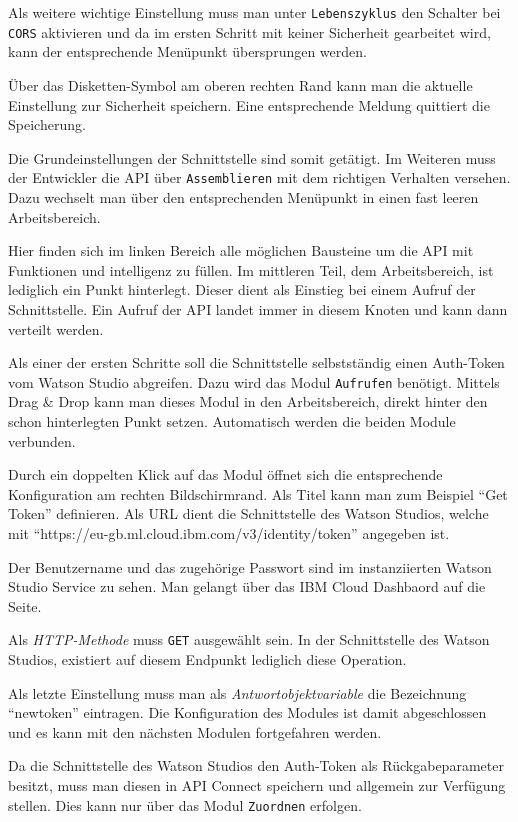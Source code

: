Als weitere wichtige Einstellung muss man unter \texttt{Lebenszyklus} den Schalter bei \texttt{CORS} aktivieren und da
im ersten Schritt mit keiner Sicherheit gearbeitet wird, kann der entsprechende Menüpunkt übersprungen werden.

Über das Disketten-Symbol am oberen rechten Rand kann man die aktuelle Einstellung zur Sicherheit speichern. Eine
entsprechende Meldung quittiert die Speicherung.

Die Grundeinstellungen der Schnittstelle sind somit getätigt. Im Weiteren muss der Entwickler die API über
\texttt{Assemblieren} mit dem richtigen Verhalten versehen. Dazu wechselt man über den entsprechenden Menüpunkt in einen
fast leeren Arbeitsbereich.

Hier finden sich im linken Bereich alle möglichen Bausteine um die API mit Funktionen und intelligenz zu füllen. Im
mittleren Teil, dem Arbeitsbereich, ist lediglich ein Punkt hinterlegt. Dieser dient als Einstieg bei einem Aufruf der
Schnittstelle. Ein Aufruf der API landet immer in diesem Knoten und kann dann verteilt werden.

Als einer der ersten Schritte soll die Schnittstelle selbstständig einen Auth-Token vom Watson Studio abgreifen. Dazu
wird das Modul \texttt{Aufrufen} benötigt. Mittels Drag \& Drop kann man dieses Modul in den Arbeitsbereich, direkt
hinter den schon hinterlegten Punkt setzen. Automatisch werden die beiden Module verbunden.

Durch ein doppelten Klick auf das Modul öffnet sich die entsprechende Konfiguration am rechten Bildschirmrand. Als Titel
kann man zum Beispiel \enquote{Get Token} definieren. Als URL dient die Schnittstelle des Watson Studios, welche mit
\enquote{https://eu-gb.ml.cloud.ibm.com/v3/identity/token} angegeben ist.

Der Benutzername und das zugehörige Passwort sind im instanziierten Watson Studio Service zu sehen. Man gelangt über das
IBM Cloud Dashbaord auf die Seite.

Als \textit{HTTP-Methode} muss \texttt{GET} ausgewählt sein. In der Schnittstelle des Watson Studios, existiert auf
diesem Endpunkt lediglich diese Operation.

Als letzte Einstellung muss man als \textit{Antwortobjektvariable} die Bezeichnung \enquote{newtoken} eintragen. Die
Konfiguration des Modules ist damit abgeschlossen und es kann mit den nächsten Modulen fortgefahren werden.

Da die Schnittstelle des Watson Studios den Auth-Token als Rückgabeparameter besitzt, muss man diesen in API Connect
speichern und allgemein zur Verfügung stellen. Dies kann nur über das Modul \texttt{Zuordnen} erfolgen.

